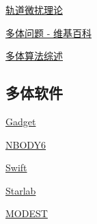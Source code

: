 
\begin{issues}
\issueDraft
\end{issues}

\href{https://en.wikipedia.org/wiki/Orbit_modeling}{轨道微扰理论}

\href{https://en.wikipedia.org/wiki/N-body_problem}{多体问题 - 维基百科}

\href{https://arxiv.org/abs/0806.3950v1}{多体算法综述}

\subsection{多体软件}
\href{https://wwwmpa.mpa-garching.mpg.de/gadget/}{Gadget}

\href{https://people.ast.cam.ac.uk/~sverre/web/pages/nbody.htm}{NBODY6}

\href{https://www.boulder.swri.edu/~hal/swift.html}{Swift}

\href{https://www.sns.ias.edu/~starlab/}{Starlab}

\href{http://www.manybody.org/modest/}{MODEST}
